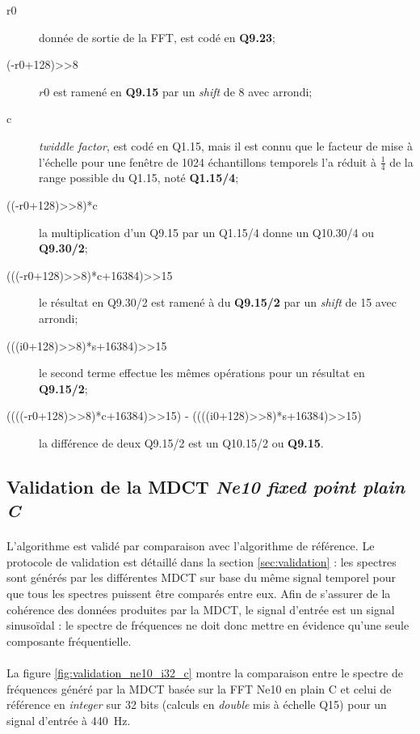 \documentclass{article}
\begin{document}
    \begin{description}
        \item[r0] donnée de sortie de la FFT, est codé en \textbf{Q9.23};
        \item[(-r0+128)>>8] $r0$ est ramené en \textbf{Q9.15} par un \emph{shift} de 8 avec arrondi;
        \item[c] \emph{twiddle factor}, est codé en Q1.15, mais il est connu que le facteur de mise à l'échelle pour une fenêtre de 1024 échantillons temporels l'a réduit à $\frac{1}{4}$ de la range possible du Q1.15, noté \textbf{Q1.15/4};
        \item[((-r0+128)>>8)*c] la multiplication d'un Q9.15 par un Q1.15/4 donne un Q10.30/4 ou \textbf{Q9.30/2};
        \item[(((-r0+128)>>8)*c+16384)>>15] le résultat en Q9.30/2 est ramené à du \textbf{Q9.15/2} par un \emph{shift} de 15 avec arrondi;
        \item[(((i0+128)>>8)*s+16384)>>15] le second terme effectue les mêmes opérations pour un résultat en \textbf{Q9.15/2};
        \item[((((-r0+128)>>8)*c+16384)>>15) - ((((i0+128)>>8)*s+16384)>>15)] la différence de deux Q9.15/2 est un Q10.15/2 ou \textbf{Q9.15}.
    \end{description}


    \subsection{Validation de la MDCT \emph{Ne10 fixed point plain C}}
    \paragraph{}
    L'algorithme est validé par comparaison avec l'algorithme de référence. Le protocole de validation est détaillé dans la section \ref{sec:validation} : les spectres sont générés par les différentes MDCT sur base du même signal temporel pour que tous les spectres puissent être comparés entre eux. Afin de s'assurer de la cohérence des données produites par la MDCT, le signal d'entrée est un signal sinusoïdal : le spectre de fréquences ne doit donc mettre en évidence qu'une seule composante fréquentielle.

    \paragraph{}
    La figure \ref{fig:validation_ne10_i32_c} montre la comparaison entre le spectre de fréquences généré par la MDCT basée sur la FFT Ne10 en plain C et celui de référence en \emph{integer} sur 32 bits (calculs en \emph{double} mis à échelle Q15) pour un signal d'entrée à \SI{440}{\hertz}.
\end{document}
